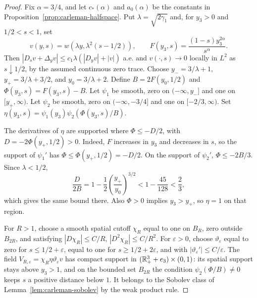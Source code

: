 \documentclass[11pt,letterpaper]{article}
\numberwithin{equation}{section}
\theoremstyle{plain}
\theoremstyle{definition}
\theoremstyle{remark}
\begin{document}
\begin{proof}
Fix $\alpha=3/4$, and let $c_*(\alpha)$ and $a_0(\alpha)$ be the constants
in Proposition~\ref{prop:carleman-halfspace}. Put
$\lambda=\sqrt{2\gamma_1}$ and, for $y_3>0$ and $1/2<s<1$, set
\[
 v(y,s)=w(\lambda y,\lambda^2(s-1/2)),\qquad
 F(y_3,s)=\frac{(1-s)y_3^{2\alpha}}{s^\alpha}.
\]
Then $|D_sv+\Delta_yv|\le c_1\lambda(|D_yv|+|v|)$ a.e. and
$v(\cdot,s)\to0$ locally in $L^2$ as $s\downarrow1/2$, by the assumed
continuous zero trace. Choose
$y_-=3/\lambda+1$, $y_+=3/\lambda+3/2$, and
$y_0=3/\lambda+2$. Define
$B=2F(y_0,1/2)$ and $\Phi(y_3,s)=F(y_3,s)-B$. Let $\psi_1$ be smooth,
zero on $(-\infty,y_-]$ and one on $[y_+,\infty)$. Let $\psi_2$ be smooth,
zero on $(-\infty,-3/4]$ and one on $[-2/3,\infty)$. Set
$\eta(y_3,s)=\psi_1(y_3)\psi_2(\Phi(y_3,s)/B)$.

The derivatives of $\eta$ are supported where $\Phi\le-D/2$, with
$D=-2\Phi(y_+,1/2)>0$. Indeed, $F$ increases in $y_3$ and decreases in
$s$, so the support of $\psi_1'$ has $\Phi\le\Phi(y_+,1/2)=-D/2$.
On the support of $\psi_2'$, $\Phi\le-2B/3$. Since $\lambda<1/2$,
\[
 \frac{D}{2B}=1-\frac12\left(\frac{y_+}{y_0}\right)^{3/2}
 <1-\frac{45}{128}<\frac23,
\]
which gives the same bound there. Also $\Phi>0$ implies $y_3>y_+$, so
$\eta=1$ on that region.

For $R>1$, choose a smooth spatial cutoff $\chi_R$ equal to one on $B_R$,
zero outside $B_{2R}$, and satisfying
$|D\chi_R|\le C/R$, $|D^2\chi_R|\le C/R^2$. For $\varepsilon>0$, choose
$\vartheta_\varepsilon$ equal to zero for $s\le1/2+\varepsilon$, equal to
one for $s\ge1/2+2\varepsilon$, and with
$|\vartheta_\varepsilon'|\le C/\varepsilon$. The field
$V_{R,\varepsilon}=\chi_R\eta\vartheta_\varepsilon v$ has compact support
in $(\mathbb{R}^3_++e_3)\times(0,1)$: its spatial support stays above $y_3>1$,
and on the bounded set $B_{2R}$ the condition $\psi_2(\Phi/B)\ne0$
keeps $s$ a positive distance below $1$. It belongs to the Sobolev class of
Lemma~\ref{lem:carleman-sobolev} by the weak product rule.


\end{proof}
\end{document}
